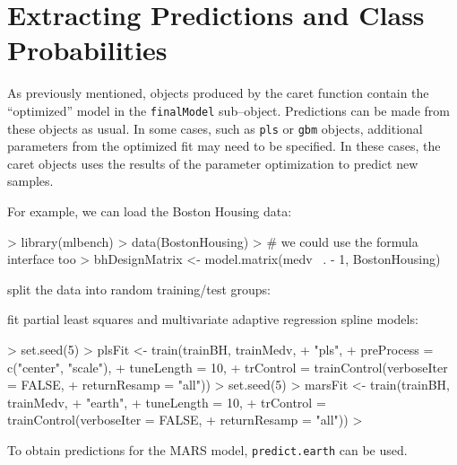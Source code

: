 \documentclass[12pt]{article}
\newcommand{\code}[1]{\mbox{\footnotesize\color{darkblue}\texttt{#1}}}
\newcommand{\pkg}[1]{{\fontseries{b}\selectfont #1}}
\renewcommand{\pkg}[1]{{\textsf{#1}}}
\renewenvironment{Schunk}{\vspace{\topsep}}{\vspace{\topsep}}
\begin{document}
\section{Extracting Predictions and Class Probabilities}\label{S:probs}

As previously mentioned, objects produced by the \pkg{caret}
function contain the ``optimized'' model in the \code{finalModel}
sub--object. Predictions can be made from these objects as usual. In
some cases, such as \code{pls} or \code{gbm} objects, additional
parameters from the optimized fit may need to be specified. In these
cases, the \pkg{caret} objects uses the results of the parameter
optimization to predict new samples. 

For example, we can load the Boston Housing data:

\begin{small}
\begin{Schunk}
\begin{Sinput}
> library(mlbench)
> data(BostonHousing)
> # we could use the formula interface too
> bhDesignMatrix <-  model.matrix(medv ~. - 1, BostonHousing)
\end{Sinput}
\end{Schunk}
\end{small}

\noindent split the data into random training/test groups:

\begin{small}
\begin{Schunk}
\end{Schunk}
\end{small}

\noindent fit partial least squares and multivariate adaptive regression spline models:

\begin{small}
\begin{Schunk}
\begin{Sinput}
> set.seed(5)
> plsFit <- train(trainBH, trainMedv, 
+                 "pls", 
+                 preProcess = c("center", "scale"),
+                 tuneLength = 10, 
+                 trControl = trainControl(verboseIter = FALSE,
+                                          returnResamp = "all"))
> set.seed(5)
> marsFit <- train(trainBH, trainMedv, 
+                  "earth", 
+                  tuneLength = 10, 
+                  trControl = trainControl(verboseIter = FALSE,
+                                           returnResamp = "all"))
> 
\end{Sinput}
\end{Schunk}
\end{small} 
To obtain predictions  for the MARS model, \code{predict.earth} can be
used. 
\end{document}
